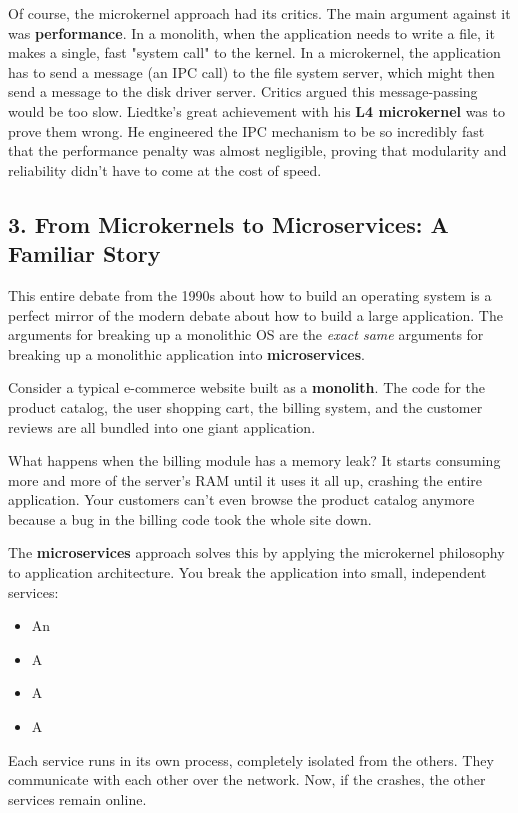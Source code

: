 Of course, the microkernel approach had its critics. The main argument against it was \textbf{performance}. In a monolith, when the application needs to write a file, it makes a single, fast "system call" to the kernel. In a microkernel, the application has to send a message (an IPC call) to the file system server, which might then send a message to the disk driver server. Critics argued this message-passing would be too slow. Liedtke's great achievement with his \textbf{L4 microkernel} was to prove them wrong. He engineered the IPC mechanism to be so incredibly fast that the performance penalty was almost negligible, proving that modularity and reliability didn't have to come at the cost of speed.


\subsection{3. From Microkernels to Microservices: A Familiar Story}


This entire debate from the 1990s about how to build an operating system is a perfect mirror of the modern debate about how to build a large application. The arguments for breaking up a monolithic OS are the \textit{exact same} arguments for breaking up a monolithic application into \textbf{microservices}.

Consider a typical e-commerce website built as a \textbf{monolith}. The code for the product catalog, the user shopping cart, the billing system, and the customer reviews are all bundled into one giant application.

What happens when the billing module has a memory leak? It starts consuming more and more of the server's RAM until it uses it all up, crashing the entire application. Your customers can't even browse the product catalog anymore because a bug in the billing code took the whole site down.

The \textbf{microservices} approach solves this by applying the microkernel philosophy to application architecture. You break the application into small, independent services:
\begin{itemize}
\item An 
\item A 
\item A 
\item A 
\end{itemize}

Each service runs in its own process, completely isolated from the others. They communicate with each other over the network. Now, if the  crashes, the other services remain online.

